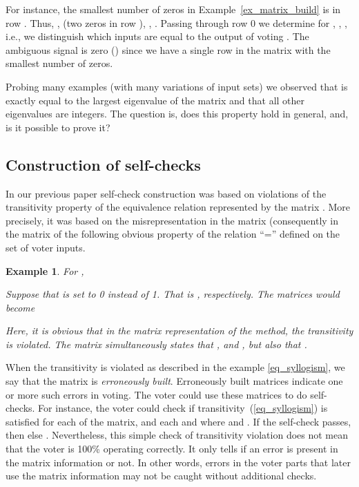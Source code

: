 \documentclass[technote, a4paper, onecolumn]{IEEEtran}  \newcommand{\avtor}{Aleksandar Simevski}
\newtheorem{ex}{Example}
\begin{document}
For instance, the smallest number of zeros in Example~\ref{ex_matrix_build} is in row . Thus, ,  (two zeros in row ), , . Passing through row 0 we determine  for , , , i.e., we distinguish which inputs are equal to the output of voting . The ambiguous signal is zero () since we have a single row in the matrix with the smallest number of zeros.

Probing many examples (with many variations of input sets) we observed that  is exactly equal to the largest eigenvalue of the  matrix and that all other eigenvalues are integers. The question is, does this property hold in general, and, is it possible to prove it?

\subsection{Construction of self-checks}\label{subsec_self_checks}

In our previous paper \cite{Simevski2012a} self-check construction was based on violations of the transitivity property of the equivalence relation represented by the matrix . More precisely, it was based on the misrepresentation in the matrix  (consequently in the matrix  of the following obvious property of the relation ``='' defined on the set of voter inputs.


\begin{ex}\label{ex_self_checks}
For ,  

\noindent Suppose that  is set to 0 instead of 1.  That is , respectively. The matrices would become

\noindent Here, it is obvious that in the matrix representation of the method, the transitivity is violated. The  matrix simultaneously states that , and , but also that .
\end{ex}

\medskip
When the transitivity is violated as described in the example \ref{eq_syllogism}, we say that the matrix is \textit{erroneously built}. Erroneously built matrices indicate one or more such errors in voting. The voter could use these matrices to do self-checks. For instance, the voter could check if transitivity~(\ref{eq_syllogism}) is satisfied for each  of the  matrix, and each  and  where  and . If the self-check passes, then  else . Nevertheless, this simple check of transitivity violation does not mean that the voter is 100\% operating correctly. It only tells if an error is present in the matrix information or not. In other words, errors in the voter parts that later use the matrix information may not be caught without additional checks.
\end{document}
